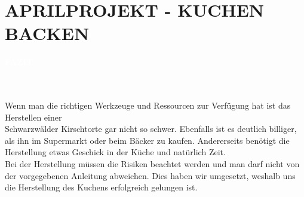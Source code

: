 \documentclass[a4paper, 12 pt]{article}
\newcommand{\coloredSectionDark}[1]{{\small \colorbox{DodgerBlue2}{\begin{minipage}{0.99\textwidth}{\textbf{#1 \vphantom{p\^{E}}}}\end{minipage}}}}
\begin{document}
\section*{\textcolor{DodgerBlue2}{APRILPROJEKT - KUCHEN BACKEN}}

\noindent
\coloredSectionDark{\textbf{\textcolor{white}{FAZIT}}}\\[-0.3cm]
\\
Wenn man die richtigen Werkzeuge und Ressourcen zur Verfügung hat ist das Herstellen einer \\
Schwarzwälder Kirschtorte gar nicht so schwer.
Ebenfalls ist es deutlich billiger, als ihn im Supermarkt oder beim Bäcker zu kaufen. Andererseits benötigt die Herstellung etwas Geschick in der Küche
und natürlich Zeit. \\
Bei der Herstellung müssen die Risiken beachtet werden und man darf nicht von der vorgegebenen Anleitung abweichen. Dies haben wir umgesetzt, weshalb uns
die Herstellung des Kuchens erfolgreich gelungen ist.
\\\\\\
\end{document}
